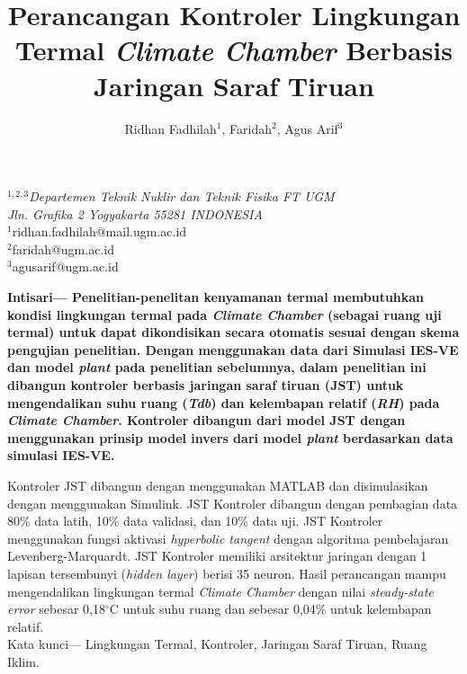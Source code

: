 \documentclass[a4paper,10pt]{article}
\title{\fontsize{24}{28}\selectfont Perancangan Kontroler Lingkungan Termal \textit{Climate Chamber} Berbasis Jaringan Saraf Tiruan}
\author{\fontsize{11}{11}\selectfont Ridhan Fadhilah$^1$, Faridah$^2$, Agus Arif$^3$}
\date{}
\begin{document}
	\setlength{\abovedisplayskip}{1pt}
	\setlength{\belowdisplayskip}{1pt}	
	
	\maketitle
	
	\vspace{-1.5cm}
	
	{\centering
		{\itshape\fontsize{10}{10}\selectfont
			$^{1,2,3}$Departemen Teknik Nuklir dan Teknik Fisika FT UGM\\
			Jln. Grafika 2 Yogyakarta 55281 INDONESIA\\
		}
		{\fontsize{9}{9}\normalfont\selectfont
			$^1$ridhan.fadhilah@mail.ugm.ac.id\\
			$^2$faridah@ugm.ac.id\\
			$^3$agusarif@ugm.ac.id\\
		}
	}
	
	\vspace{0.3cm}
	
	{\setlength{\parindent}{0cm}\bfseries
		Intisari--- Penelitian-penelitan kenyamanan termal membutuhkan kondisi lingkungan termal pada \textit{Climate Chamber} (sebagai ruang uji termal) untuk dapat dikondisikan secara otomatis sesuai dengan skema pengujian penelitian. Dengan menggunakan data dari Simulasi IES-VE\cite{skripsiIchfan} dan model \textit{plant}\cite{skripsiTanto} pada penelitian sebelumnya, dalam penelitian ini dibangun kontroler berbasis jaringan saraf tiruan (JST) untuk mengendalikan suhu ruang (\textit{Tdb}) dan kelembapan relatif (\textit{RH}) pada \textit{Climate Chamber}. Kontroler dibangun dari model JST dengan menggunakan prinsip model invers dari model \textit{plant} berdasarkan data simulasi IES-VE.
		
		Kontroler JST dibangun dengan menggunakan MATLAB dan disimulasikan dengan menggunakan Simulink. JST Kontroler dibangun dengan pembagian data 80\% data latih, 10\% data validasi, dan 10\% data uji. JST Kontroler menggunakan fungsi aktivasi \textit{hyperbolic tangent} dengan algoritma pembelajaran Levenberg-Marquardt. JST Kontroler memiliki arsitektur jaringan dengan 1 lapisan tersembunyi (\textit{hidden layer}) berisi 35 neuron. Hasil perancangan mampu mengendalikan lingkungan termal \textit{Climate Chamber} dengan nilai \textit{steady-state error} sebesar 0,18$^\circ$C untuk suhu ruang dan sebesar 0,04\% untuk kelembapan relatif.\\
		
		Kata kunci--- Lingkungan Termal, Kontroler, Jaringan Saraf Tiruan, Ruang Iklim.
	}
	
\end{document}
